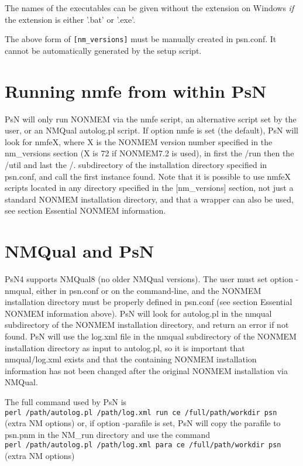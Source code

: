The names of the executables can be given without the
extension on Windows \emph{if} the extension is either 
'.bat' or '.exe'. 

The above form of \verb|[nm_versions]| must
be manually created in psn.conf. It cannot
be automatically generated by the setup script.

\section{Running nmfe from within PsN}

PsN will only run NONMEM via the nmfe script, an alternative script set by the user, or an NMQual autolog.pl script. 
If option nmfe is set (the default), PsN will look for nmfeX, where X is the NONMEM version number specified in the nm\_versions section (X is 72 if NONMEM7.2 is used),  in first the /run then the  /util and last the /. subdirectory of the installation directory specified in psn.conf, and call the first instance found. Note that it is possible to use nmfeX scripts located in any directory specified in the [nm\_versions] section, not just a standard NONMEM installation directory, and that a wrapper can also be used, see section Essential NONMEM information.

\section{NMQual and PsN}

PsN4 supports NMQual8 (no older NMQual versions). The user must set option -nmqual, either in psn.conf or on the command-line, and
the NONMEM installation directory must be properly defined in psn.conf (see section Essential NONMEM information above). PsN will look for autolog.pl in the nmqual subdirectory
of the NONMEM installation directory, and return an error if not found.
PsN will use the log.xml file in the nmqual subdirectory of the NONMEM installation directory as input to autolog.pl, so it is important that nmqual/log.xml exists and that the containing NONMEM installation information has not been changed after the original NONMEM installation via NMQual.

\noindent The full command used by PsN is\\
\verb|perl /path/autolog.pl /path/log.xml run ce /full/path/workdir psn| (extra NM options)
\noindent or, if option -parafile is set, PsN will copy the parafile
to psn.pnm in the NM\_run directory and use the command\\
\verb|perl /path/autolog.pl /path/log.xml para ce /full/path/workdir psn| (extra NM options)

